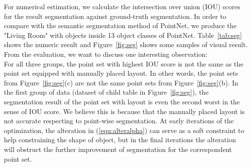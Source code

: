 %
For numerical estimation, we calculate the intersection over union (IOU) scores for the result segmentation against ground-truth segmentation. 
In order to compare with the semantic segmentation method of PointNet\cite{qi2016pointnet}, we produce the "Living Room" with objects inside 13 object classes of PointNet\cite{qi2016pointnet}.
Table~\ref{tab:seg} shows the numeric result and Figure~\ref{fig:seg} shows some samples of visual result.
From the evaluation, we want to discuss one interesting observation:\\
%
For all three groups, the point set with highest IOU score is not the same as the point set equipped with manually placed layout.
In other words, the point sets from Figure~\ref{fig:seg}(c) are not the same point sets from Figure~\ref{fig:seg}(b). 
In the first group of data (dataset of child table in Figure~\ref{fig:seg}), the segmentation result of the point set with layout is even the second worst in the sense of IOU score. We believe this is because that the manually placed layout is not accurate respecting to point-wise segmentation. 
At early iterations of the optimization, the alteration in (\ref{equ:alteralpha}) can serve as a soft constraint to help constraining the shape of object, but in the final iterations the alteration will obstruct the further improvement of segmentation for the correspondent point set. 

